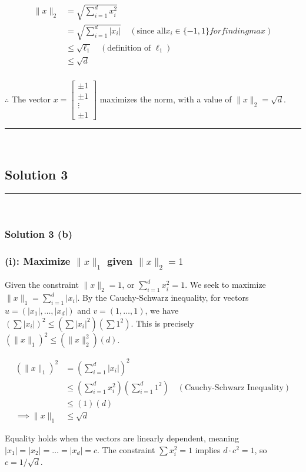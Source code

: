 \documentclass{article}
\begin{document}
\begin{align*}
    \|x\|_2 &= \sqrt{\sum_{i=1}^d x_i^2} \\
    &= \sqrt{\sum_{i=1}^d |x_i|} \quad (\text{since all} x_i \in \{-1,1\} for finding max) \\
    &\le \sqrt{\ell_1} \quad (\text{definition of  } \ell_1) \\
    &\le \sqrt{d} 
\end{align*}

\subsubsection*{\normalfont}{$\therefore$ The vector $x = \begin{bmatrix} \pm 1 \\ \pm 1 \\ \vdots \\ \pm 1 \end{bmatrix}$ maximizes the norm, with a value of $\|x\|_2 = \sqrt{d}$.}

\noindent\rule{\textwidth}{0.4pt}\\

\newpage

\subsection*{Solution 3}
\noindent\rule{\textwidth}{0.4pt}\\
\subsubsection*{Solution 3 (b)}
\subsubsection*{(i): Maximize $\|x\|_1$ given $\|x\|_{2}=1$}
\parbox{\textwidth}{
Given the constraint $\|x\|_{2} = 1$, or $\sum_{i=1}^d x_i^2 = 1$. We seek to maximize $\|x\|_1 = \sum_{i=1}^d |x_i|$. By the Cauchy-Schwarz inequality, for vectors $u=(|x_1|, \dots, |x_d|)$ and $v=(1, \dots, 1)$, we have $(\sum |x_i|)^2 \le (\sum |x_i|^2)(\sum 1^2)$. This is precisely $(\|x\|_1)^2 \le (\|x\|_2^2)(d)$.
}
\begin{align*}
    (\|x\|_1)^2 &= \left(\sum_{i=1}^d |x_i|\right)^2 \\
    &\le \left(\sum_{i=1}^d x_i^2\right) \left(\sum_{i=1}^d 1^2\right) \quad (\text{Cauchy-Schwarz Inequality}) \\
    &\le (1)(d) \\
    \implies \|x\|_1 &\le \sqrt{d}
\end{align*}
\parbox{\textwidth}{
Equality holds when the vectors are linearly dependent, meaning $|x_1|=|x_2|=\dots=|x_d|=c$. The constraint $\sum x_i^2 = 1$ implies $d \cdot c^2 = 1$, so $c=1/\sqrt{d}$.
}
\end{document}
